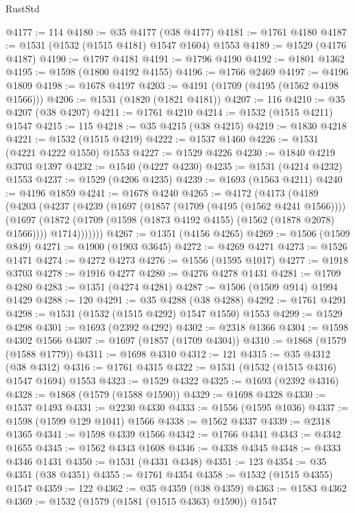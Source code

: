 \begin{lexlean}{RustStd}
\begin{coremodule}
@4177 := 114
@4180 := @35 @4177 (@38 @4177)
@4181 := @1761 @4180
@4187 := @1531 (@1532 (@1515 @4181) @1547 @1604) @1553
@4189 := @1529 (@4176 @4187)
@4190 := @1797 @4181
@4191 := @1796 @4190
@4192 := @1801 @1362
@4195 := @1598 (@1800 @4192 @4155)
@4196 := @1766 @2469
@4197 := @4196 @1809
@4198 := @1678 @4197
@4203 := @4191 (@1709 (@4195 (@1562 @4198 @1566)))
@4206 := @1531 (@1820 (@1821 @4181))
@4207 := 116
@4210 := @35 @4207 (@38 @4207)
@4211 := @1761 @4210
@4214 := @1532 (@1515 @4211) @1547
@4215 := 115
@4218 := @35 @4215 (@38 @4215)
@4219 := @1830 @4218
@4221 := @1532 (@1515 @4219)
@4222 := @1537 @1460
@4226 := @1531 (@4221 @4222 @1550) @1553
@4227 := @1529 @4226
@4230 := @1840 @4219 @3703 @1397
@4232 := @1540 (@4227 @4230)
@4235 := @1531 (@4214 @4232) @1553
@4237 := @1529 (@4206 @4235)
@4239 := @1693 (@1563 @4211)
@4240 := @4196 @1859
@4241 := @1678 @4240
@4265 := @4172
    (@4173
      (@4189
        (@4203
          (@4237
            (@4239
              (@1697
                (@1857 (@1709 (@4195 (@1562 @4241 @1566))))
                (@1697
                  (@1872 (@1709 (@1598 (@1873 @4192 @4155) (@1562 (@1878 @2078) @1566))))
                  @1714)))))))
@4267 := @1351 (@4156 @4265)
@4269 := @1506 (@1509 @849)
@4271 := @1900 (@1903 @3645)
@4272 := @4269 @4271
@4273 := @1526 @1471
@4274 := @4272 @4273
@4276 := @1556 (@1595 @1017)
@4277 := @1918 @3703
@4278 := @1916 @4277
@4280 := @4276 @4278 @1431
@4281 := @1709 @4280
@4283 := @1351 (@4274 @4281)
@4287 := @1506 (@1509 @914) @1994 @1429
@4288 := 120
@4291 := @35 @4288 (@38 @4288)
@4292 := @1761 @4291
@4298 := @1531 (@1532 (@1515 @4292) @1547 @1550) @1553
@4299 := @1529 @4298
@4301 := @1693 (@2392 @4292)
@4302 := @2318 @1366
@4304 := @1598 @4302 @1566
@4307 := @1697 (@1857 (@1709 @4304))
@4310 := @1868 (@1579 (@1588 @1779))
@4311 := @1698 @4310
@4312 := 121
@4315 := @35 @4312 (@38 @4312)
@4316 := @1761 @4315
@4322 := @1531 (@1532 (@1515 @4316) @1547 @1694) @1553
@4323 := @1529 @4322
@4325 := @1693 (@2392 @4316)
@4328 := @1868 (@1579 (@1588 @1590))
@4329 := @1698 @4328
@4330 := @1537 @1493
@4331 := @2230 @4330
@4333 := @1556 (@1595 @1036)
@4337 := @1598 (@1599 @129 @1041) @1566
@4338 := @1562 @4337
@4339 := @2318 @1365
@4341 := @1598 @4339 @1566
@4342 := @1766 @4341
@4343 := @4342 @1655
@4345 := @1562 @4343 @1608
@4346 := @4338 @4345
@4348 := @4333 @4346 @1431
@4350 := @1531 (@4331 @4348)
@4351 := 123
@4354 := @35 @4351 (@38 @4351)
@4355 := @1761 @4354
@4358 := @1532 (@1515 @4355) @1547
@4359 := 122
@4362 := @35 @4359 (@38 @4359)
@4363 := @1583 @4362
@4369 := @1532 (@1579 (@1581 (@1515 @4363) @1590)) @1547

\end{coremodule}
\end{lexlean}
